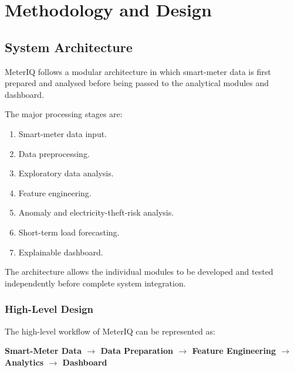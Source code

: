 \documentclass{tietreport}
\begin{document}

\chapter{Methodology and Design}

\section{System Architecture}

MeterIQ follows a modular architecture in which smart-meter data is first
prepared and analysed before being passed to the analytical modules and
dashboard.

The major processing stages are:

\begin{enumerate}
    \item Smart-meter data input.
    \item Data preprocessing.
    \item Exploratory data analysis.
    \item Feature engineering.
    \item Anomaly and electricity-theft-risk analysis.
    \item Short-term load forecasting.
    \item Explainable dashboard.
\end{enumerate}

The architecture allows the individual modules to be developed and tested
independently before complete system integration.

\subsection{High-Level Design}

The high-level workflow of MeterIQ can be represented as:

\begin{center}
\textbf{
Smart-Meter Data
$\rightarrow$
Data Preparation
$\rightarrow$
Feature Engineering
$\rightarrow$
Analytics
$\rightarrow$
Dashboard
}
\end{center}
\end{document}
